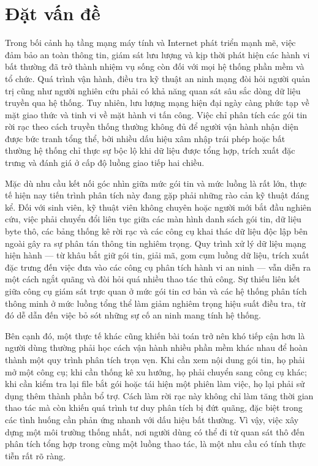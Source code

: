 \documentclass[../DoAn.tex]{subfiles}
\begin{document}
\section{Đặt vấn đề}
Trong bối cảnh hạ tầng mạng máy tính và Internet phát triển mạnh mẽ, việc đảm bảo an toàn thông tin, giám sát lưu lượng và kịp thời phát hiện các hành vi bất thường đã trở thành nhiệm vụ sống còn đối với mọi hệ thống phần mềm và tổ chức. Quá trình vận hành, điều tra kỹ thuật an ninh mạng đòi hỏi người quản trị cũng như người nghiên cứu phải có khả năng quan sát sâu sắc dòng dữ liệu truyền qua hệ thống. Tuy nhiên, lưu lượng mạng hiện đại ngày càng phức tạp về mặt giao thức và tinh vi về mặt hành vi tấn công. Việc chỉ phân tích các gói tin rời rạc theo cách truyền thống thường không đủ để người vận hành nhận diện được bức tranh tổng thể, bởi nhiều dấu hiệu xâm nhập trái phép hoặc bất thường hệ thống chỉ thực sự bộc lộ khi dữ liệu được tổng hợp, trích xuất đặc trưng và đánh giá ở cấp độ luồng giao tiếp hai chiều.

Mặc dù nhu cầu kết nối góc nhìn giữa mức gói tin và mức luồng là rất lớn, thực tế hiện nay tiến trình phân tích này đang gặp phải những rào cản kỹ thuật đáng kể. Đối với sinh viên, kỹ thuật viên không chuyên hoặc người mới bắt đầu nghiên cứu, việc phải chuyển đổi liên tục giữa các màn hình danh sách gói tin, dữ liệu byte thô, các bảng thống kê rời rạc và các công cụ khai thác dữ liệu độc lập bên ngoài gây ra sự phân tán thông tin nghiêm trọng. Quy trình xử lý dữ liệu mạng hiện hành — từ khâu bắt giữ gói tin, giải mã, gom cụm luồng dữ liệu, trích xuất đặc trưng đến việc đưa vào các công cụ phân tích hành vi an ninh — vẫn diễn ra một cách ngắt quãng và đòi hỏi quá nhiều thao tác thủ công. Sự thiếu liên kết giữa công cụ giám sát trực quan ở mức gói tin cơ bản và các hệ thống phân tích thông minh ở mức luồng tổng thể làm giảm nghiêm trọng hiệu suất điều tra, từ đó dễ dẫn đến việc bỏ sót những sự cố an ninh mang tính hệ thống.

Bên cạnh đó, một thực tế khác cũng khiến bài toán trở nên khó tiếp cận hơn là người dùng thường phải học cách vận hành nhiều phần mềm khác nhau để hoàn thành một quy trình phân tích trọn vẹn. Khi cần xem nội dung gói tin, họ phải mở một công cụ; khi cần thống kê xu hướng, họ phải chuyển sang công cụ khác; khi cần kiểm tra lại file bắt gói hoặc tái hiện một phiên làm việc, họ lại phải sử dụng thêm thành phần bổ trợ. Cách làm rời rạc này không chỉ làm tăng thời gian thao tác mà còn khiến quá trình tư duy phân tích bị đứt quãng, đặc biệt trong các tình huống cần phản ứng nhanh với dấu hiệu bất thường. Vì vậy, việc xây dựng một môi trường thống nhất, nơi người dùng có thể đi từ quan sát thô đến phân tích tổng hợp trong cùng một luồng thao tác, là một nhu cầu có tính thực tiễn rất rõ ràng.
\end{document}
